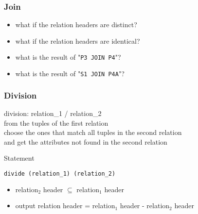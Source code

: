 \documentclass[dvipsnames]{beamer}
\theoremstyle{plain}
\begin{document}
\begin{frame}
  \frametitle{Join}

  \begin{itemize}
    \item what if the relation headers are distinct?
    \item what if the relation headers are identical?
  \end{itemize}

  \pause
  \begin{example}
    \begin{itemize}
      \item what is the result of "\lstinline!P3 JOIN P4!"?
      \item what is the result of "\lstinline!S1 JOIN P4A!"?
    \end{itemize}
  \end{example}
\end{frame}

\begin{frame}[fragile]
  \frametitle{Division}

  \begin{definition}
    \alert{division}: relation\_1 / relation\_2\\
      from the tuples of the first relation\\
      choose the ones that match all tuples in the second relation\\
      and get the attributes not found in the second relation
  \end{definition}

  \pause
  \begin{block}{Statement}
    \begin{lstlisting}
divide (relation_1) (relation_2)
    \end{lstlisting}
  \end{block}

  \pause
  \begin{itemize}
    \item relation$_2$ header $\subseteq$ relation$_1$ header

    \pause
    \item output relation header = relation${_1}$ header - relation${_2}$
      header
  \end{itemize}
\end{frame}
\end{document}
